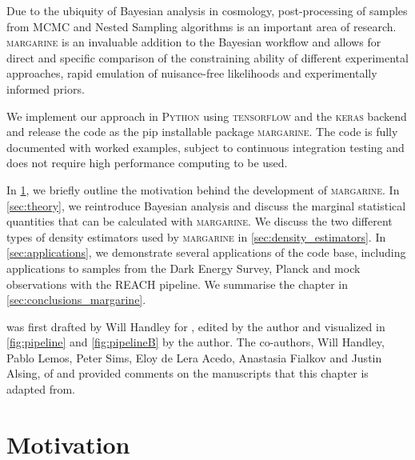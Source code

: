Due to the ubiquity of Bayesian analysis in cosmology, post-processing of samples from MCMC and Nested Sampling algorithms is an important area of research. \textsc{margarine} is an invaluable addition to the Bayesian workflow and allows for direct and specific comparison of the constraining ability of different experimental approaches, rapid emulation of nuisance-free likelihoods and experimentally informed priors.

We implement our approach in \textsc{Python} using \textsc{tensorflow} and the \textsc{keras} backend and release the code as the pip installable package \textsc{margarine}. The code is fully documented with worked examples, subject to continuous integration testing and does not require high performance computing to be used.

In \cref{sec:motivation}, we briefly outline the motivation behind the development of \textsc{margarine}. In \cref{sec:theory}, we reintroduce Bayesian analysis and discuss the marginal statistical quantities that can be calculated with \textsc{margarine}. We discuss the two different types of density estimators used by \textsc{margarine} in \cref{sec:density_estimators}. In \cref{sec:applications}, we demonstrate several applications of the code base, including applications to samples from the Dark Energy Survey, Planck and mock observations with the REACH pipeline. We summarise the chapter in \cref{sec:conclusions_margarine}.


 was first drafted by Will Handley for \cite{margarine_maxent}, edited by the author and visualized in \cref{fig:pipeline} and \cref{fig:pipelineB} by the author. The co-authors, Will Handley, Pablo Lemos, Peter Sims, Eloy de Lera Acedo, Anastasia Fialkov and Justin Alsing, of \cite{margarine_maxent} and \cite{margarine_neurips} provided comments on the manuscripts that this chapter is adapted from.

\section{Motivation}
\label{sec:motivation}

